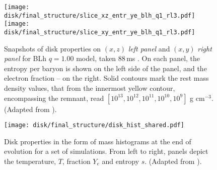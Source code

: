 \begin{figure}[t]
    \centering
    \texttt{[image: disk/final\_structure/slice\_xz\_entr\_ye\_blh\_q1\_rl3.pdf]}
    \texttt{[image: disk/final\_structure/slice\_xy\_entr\_ye\_blh\_q1\_rl3.pdf]}
    \caption{
        Snapshots of disk properties on $(x,z)$ \textit{left panel} and 
        $(x,y)$ \textit{right panel} for BLh $q=1.00$ model, taken 
        $88\,$ms \pmerg{}. 
        On each panel, the entropy per baryon is shown on the left 
        side of the panel, and the electron fraction -- on the right. 
        Solid contours mark the rest mass density values, that from the 
        innermost yellow contour, encompassing the remnant, read 
        $[10^{13}, 10^{12}, 10^{11}, 10^{10}, 10^{9}]$ g cm$^{-3}$.
        (Adapted from \citet{Nedora:2020pak}). 
    }  
    \label{fig:snapshots_xy_ye_entr}
\end{figure}

\begin{figure*}[t]
    \centering 
    \texttt{[image: disk/final\_structure/disk\_hist\_shared.pdf]}
    \caption{
        Disk properties in the form of mass histograms 
        at the end of evolution for a set of simulations.
        From left to right, panels depict the temperature, $T$, 
        fraction $Y_e$ and entropy $s$. 
        (Adapted from \citet{Nedora:2020pak}).
%        
    }
    \label{fig:final_disk_struct_hist_long}
\end{figure*}

